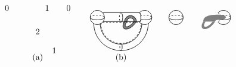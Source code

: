 \[\begin{tikzpicture}[line width=.6, baseline=(base.base)]
    \node at (0,-0.6) {2};
    \node at (.4,0.4) {1};
    \node at (.7,-1.4) {1};
    \node at (1.3,0.4) {0};
    \node at (-1.3,0.4) {0};
    \node (base) at (0,-1.7) {(a)};
\end{tikzpicture}
\qquad
\begin{tikzpicture}[line width=.6, baseline=(base.base)]
    \tikzstyle{dp}=[dash pattern=on 2pt off 2pt]
    \fill[black!50] (.15,-.17) arc (180:0:.25);
    \fill[white] (.25,-.17) arc (180:0:.15);
    \fill[black!50] (.15,-.17) .. controls (-.1,-.6) and (.4,-.6) .. (.65,-.17);
    \fill[white] (.25,-.17) .. controls (.05,-.47) and (.32,-.47) .. (.55,-.17);
    \draw (-1,0) circle (0.3);
    \draw (1,0) circle (0.3);
    \draw[dp] (-1.3,0) arc (180:0:0.3 and 0.1);
    \draw (-1.3,0) arc (180:360:0.3 and 0.1);
    \draw[dp] (.7,0) arc (180:0:0.3 and 0.1);
    \draw (.7,0) arc (180:360:0.3 and 0.1);
    \draw[dp,fill=white] (.77,0) ellipse (.07 and .2);
    \fill[white] (.72,0) ellipse (.07 and .2);
    \draw (-.77,.2) -- (.77,.2);
    \draw[dp] (-.77,-.2) -- (.77,-.2);
    \draw (-.75,-.17) -- (.8,-.17);
    \draw (.77,.2) arc (90:-90:.07 and .2);
    \draw (0,.2) arc (90:-90:.07 and .2);
    \draw[dp] (0,.2) arc (90:270:.07 and .2);
    \draw (-1.15,-.25) arc (180:360:1.15);
    \draw[dp] (-.85,-.25) arc (180:360:.85);
    \draw (-.88,-.25) arc (180:360:.88);
    \draw (0,-1.1) arc (90:-90:.05 and .15);
    \draw[dp] (0,-1.1) arc (90:270:.05 and .15);
    \draw (.15,-.17) arc (180:0:.25);
    \draw (.25,-.17) arc (180:0:.15);
    \draw (.15,-.17) .. controls (-.1,-.6) and (.4,-.6) .. (.65,-.17);
    \draw (.25,-.17) .. controls (.05,-.47) and (.32,-.47) .. (.55,-.17);
    \node (base) at (0,-1.7) {(b)};
\end{tikzpicture}
\qquad
\begin{tikzpicture}[line width=.6, baseline=(base.base)]
    \tikzstyle{dp}=[dash pattern=on 2pt off 2pt]
    \draw (-1,0) circle (0.3);
    \draw (1,0) circle (0.3);
    \draw[dp] (-1.3,0) arc (180:0:0.3 and 0.1);
    \draw (-1.3,0) arc (180:360:0.3 and 0.1);
    \draw[dp] (.7,0) arc (180:0:0.3 and 0.1);
    \draw (.7,0) arc (180:360:0.3 and 0.1);
    \draw[dp,fill=white] (.77,0) ellipse (.07 and .2);
    \fill[white] (.72,0) ellipse (.07 and .2);
    \fill[black!50] (.15,-.17) .. controls (-.1,-.6) and (.4,-.6) .. (.65,-.17);
    \fill[white] (.25,-.17) .. controls (.05,-.47) and (.32,-.47) .. (.55,-.17);
    \fill[black!50] (.15,-.17) .. controls (.15,.1) and (.5,.12) .. (.82,.12)
    				 .. controls (1.2,.12) and (1.2,-.1) .. (.82,-.1)
    				 .. controls (.75,-.1) and (.65,-.1) .. (.65,-.17);

\end{tikzpicture}\]

